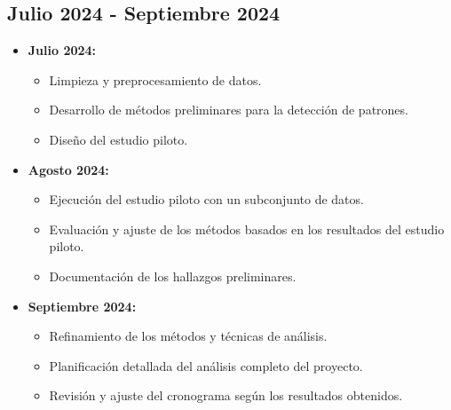 \subsection{Julio 2024 - Septiembre 2024}
\begin{itemize}
    \item \textbf{Julio 2024:}
    \begin{itemize}
        \item Limpieza y preprocesamiento de datos.
        \item Desarrollo de métodos preliminares para la detección de patrones.
        \item Diseño del estudio piloto.
    \end{itemize}
    
    \item \textbf{Agosto 2024:}
    \begin{itemize}
        \item Ejecución del estudio piloto con un subconjunto de datos.
        \item Evaluación y ajuste de los métodos basados en los resultados del estudio piloto.
        \item Documentación de los hallazgos preliminares.
    \end{itemize}
    
    \item \textbf{Septiembre 2024:}
    \begin{itemize}
        \item Refinamiento de los métodos y técnicas de análisis.
        \item Planificación detallada del análisis completo del proyecto.
        \item Revisión y ajuste del cronograma según los resultados obtenidos.
    \end{itemize}
\end{itemize}

